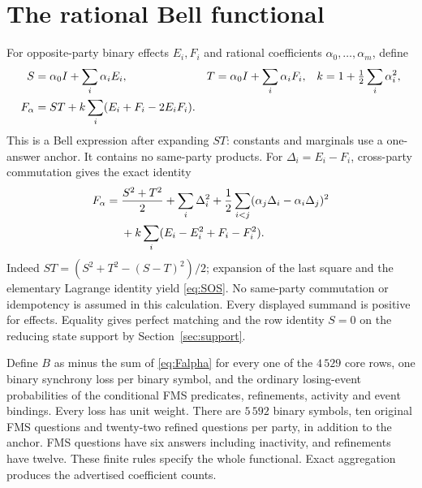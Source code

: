 \section{The rational Bell functional}\label{sec:bell}
For opposite-party binary effects $E_i,F_i$ and rational coefficients $\alpha_0,\ldots,\alpha_m$, define
\begin{align}
 S&=\alpha_0I+\sum_i\alpha_iE_i,&
 T&=\alpha_0I+\sum_i\alpha_iF_i,&
 k&=1+\tfrac12\sum_i\alpha_i^2,\notag\\
 F_\alpha&=ST+k\sum_i(E_i+F_i-2E_iF_i).\label{eq:Falpha}
\end{align}
This is a Bell expression after expanding $ST$: constants and marginals use a one-answer anchor. It contains no same-party products. For $\Delta_i=E_i-F_i$, cross-party commutation gives the exact identity
\begin{align}\label{eq:SOS}
 F_\alpha={}&\frac{S^2+T^2}{2}+\sum_i\Delta_i^2
 +\frac12\sum_{i<j}(\alpha_j\Delta_i-\alpha_i\Delta_j)^2\\
 &+k\sum_i(E_i-E_i^2+F_i-F_i^2).\notag
\end{align}
Indeed $ST=(S^2+T^2-(S-T)^2)/2$; expansion of the last square and the elementary Lagrange identity yield \eqref{eq:SOS}. No same-party commutation or idempotency is assumed in this calculation. Every displayed summand is positive for effects. Equality gives perfect matching and the row identity $S=0$ on the reducing state support by Section~\ref{sec:support}.

Define $B$ as minus the sum of \eqref{eq:Falpha} for every one of the $4\,529$ core rows, one binary synchrony loss per binary symbol, and the ordinary losing-event probabilities of the conditional FMS predicates, refinements, activity and event bindings. Every loss has unit weight. There are $5\,592$ binary symbols, ten original FMS questions and twenty-two refined questions per party, in addition to the anchor. FMS questions have six answers including inactivity, and refinements have twelve. These finite rules specify the whole functional. Exact aggregation produces the advertised coefficient counts.

